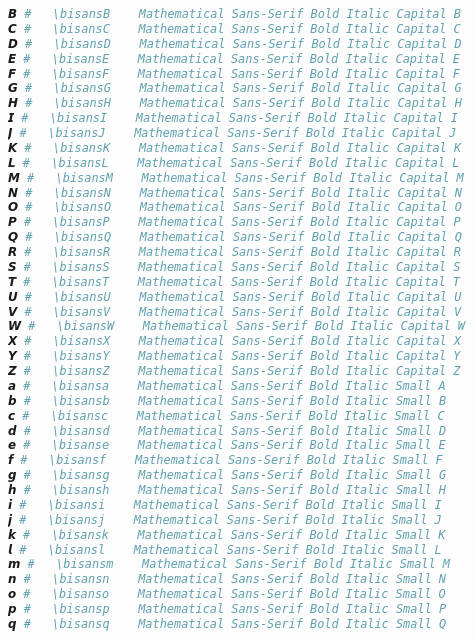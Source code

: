 \begin{lstlisting}[language=Julia]
𝘽 #   \bisansB    Mathematical Sans-Serif Bold Italic Capital B
𝘾 #   \bisansC    Mathematical Sans-Serif Bold Italic Capital C
𝘿 #   \bisansD    Mathematical Sans-Serif Bold Italic Capital D
𝙀 #   \bisansE    Mathematical Sans-Serif Bold Italic Capital E
𝙁 #   \bisansF    Mathematical Sans-Serif Bold Italic Capital F
𝙂 #   \bisansG    Mathematical Sans-Serif Bold Italic Capital G
𝙃 #   \bisansH    Mathematical Sans-Serif Bold Italic Capital H
𝙄 #   \bisansI    Mathematical Sans-Serif Bold Italic Capital I
𝙅 #   \bisansJ    Mathematical Sans-Serif Bold Italic Capital J
𝙆 #   \bisansK    Mathematical Sans-Serif Bold Italic Capital K
𝙇 #   \bisansL    Mathematical Sans-Serif Bold Italic Capital L
𝙈 #   \bisansM    Mathematical Sans-Serif Bold Italic Capital M
𝙉 #   \bisansN    Mathematical Sans-Serif Bold Italic Capital N
𝙊 #   \bisansO    Mathematical Sans-Serif Bold Italic Capital O
𝙋 #   \bisansP    Mathematical Sans-Serif Bold Italic Capital P
𝙌 #   \bisansQ    Mathematical Sans-Serif Bold Italic Capital Q
𝙍 #   \bisansR    Mathematical Sans-Serif Bold Italic Capital R
𝙎 #   \bisansS    Mathematical Sans-Serif Bold Italic Capital S
𝙏 #   \bisansT    Mathematical Sans-Serif Bold Italic Capital T
𝙐 #   \bisansU    Mathematical Sans-Serif Bold Italic Capital U
𝙑 #   \bisansV    Mathematical Sans-Serif Bold Italic Capital V
𝙒 #   \bisansW    Mathematical Sans-Serif Bold Italic Capital W
𝙓 #   \bisansX    Mathematical Sans-Serif Bold Italic Capital X
𝙔 #   \bisansY    Mathematical Sans-Serif Bold Italic Capital Y
𝙕 #   \bisansZ    Mathematical Sans-Serif Bold Italic Capital Z
𝙖 #   \bisansa    Mathematical Sans-Serif Bold Italic Small A
𝙗 #   \bisansb    Mathematical Sans-Serif Bold Italic Small B
𝙘 #   \bisansc    Mathematical Sans-Serif Bold Italic Small C
𝙙 #   \bisansd    Mathematical Sans-Serif Bold Italic Small D
𝙚 #   \bisanse    Mathematical Sans-Serif Bold Italic Small E
𝙛 #   \bisansf    Mathematical Sans-Serif Bold Italic Small F
𝙜 #   \bisansg    Mathematical Sans-Serif Bold Italic Small G
𝙝 #   \bisansh    Mathematical Sans-Serif Bold Italic Small H
𝙞 #   \bisansi    Mathematical Sans-Serif Bold Italic Small I
𝙟 #   \bisansj    Mathematical Sans-Serif Bold Italic Small J
𝙠 #   \bisansk    Mathematical Sans-Serif Bold Italic Small K
𝙡 #   \bisansl    Mathematical Sans-Serif Bold Italic Small L
𝙢 #   \bisansm    Mathematical Sans-Serif Bold Italic Small M
𝙣 #   \bisansn    Mathematical Sans-Serif Bold Italic Small N
𝙤 #   \bisanso    Mathematical Sans-Serif Bold Italic Small O
𝙥 #   \bisansp    Mathematical Sans-Serif Bold Italic Small P
𝙦 #   \bisansq    Mathematical Sans-Serif Bold Italic Small Q

\end{lstlisting}
